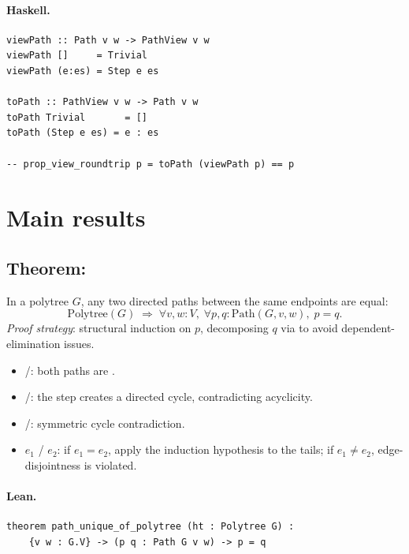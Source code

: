 \documentclass[11pt,a4paper]{article}
\begin{document}
\paragraph{Haskell.}
\begin{lstlisting}[style=haskell]
viewPath :: Path v w -> PathView v w
viewPath []     = Trivial
viewPath (e:es) = Step e es

toPath :: PathView v w -> Path v w
toPath Trivial       = []
toPath (Step e es) = e : es

-- prop_view_roundtrip p = toPath (viewPath p) == p
\end{lstlisting}


\section{Main results}

\subsection{Theorem: }

\begin{thm}
In a polytree $G$, any two directed paths between the same endpoints are equal:
\[
  \mathrm{Polytree}(G) \;\Rightarrow\;
  \forall v, w : V,\; \forall p, q : \mathrm{Path}(G, v, w),\; p = q.
\]
\emph{Proof strategy}: structural induction on $p$, decomposing $q$ via
 to avoid dependent-elimination issues.
\begin{itemize}
  \item {}/: both paths are .
  \item {}/: the step creates a directed cycle, contradicting
        acyclicity.
  \item {}/: symmetric cycle contradiction.
  \item {} $e_1$ /  $e_2$: if $e_1 = e_2$, apply the
        induction hypothesis to the tails; if $e_1 \neq e_2$, edge-disjointness
        is violated.
\end{itemize}
\end{thm}

\paragraph{Lean.}
\begin{lstlisting}[style=lean]
theorem path_unique_of_polytree (ht : Polytree G) :
    {v w : G.V} -> (p q : Path G v w) -> p = q
\end{lstlisting}
\end{document}
